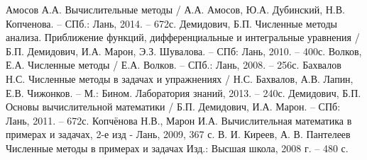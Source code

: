 \begin{thebibliography}{9}
        Амосов А.А. Вычислительные методы / А.А. Амосов, Ю.А. Дубинский, Н.В. Копченова. – СПб.: Лань, 2014. – 672с.
        Демидович, Б.П. Численные методы анализа. Приближение функций, дифференциальные и интегральные уравнения / Б.П. Демидович, И.А. Марон, Э.З. Шувалова. – СПб: Лань, 2010. – 400с.
        Волков, Е.А. Численные методы / Е.А. Волков. – СПб.: Лань, 2008. – 256с.
        Бахвалов Н.С. Численные методы в задачах и упражнениях / Н.С. Бахвалов, А.В. Лапин,  Е.В. Чижонков. – М.: Бином. Лаборатория знаний, 2013. – 240с.
        Демидович, Б.П. Основы вычислительной математики / Б.П. Демидович, И.А. Марон. – СПб: Лань, 2011. – 672с.
        Копчёнова Н.В., Марон И.А. Вычислительная математика в примерах и задачах, 2-е изд - Лань, 2009, 367 с. 
        В. И. Киреев, А. В. Пантелеев Численные методы в примерах и задачах Изд.: Высшая школа, 2008 г. – 480 с.
    


\end{thebibliography}